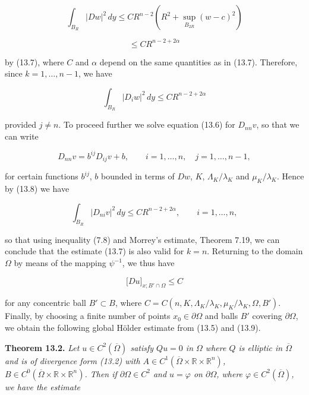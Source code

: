 \[
\int_{B_R} |Dw|^2\,dy \leq C R^{n-2}(R^2 + \sup_{B_{2R}}(w-c)^2)
\]

\[
\leq C R^{n-2+2\alpha}
\]

by (13.7), where $C$ and $\alpha$ depend on the same quantities as in (13.7). Therefore,
since $k=1,\dots,n-1$, we have

\begin{equation}
\int_{B_R} |D_i w|^2\,dy \leq C R^{n-2+2\alpha}
\tag{13.8}
\end{equation}

provided $j \neq n$. To proceed further we solve equation (13.6) for $D_{nn}v$, so that we
can write

\[
D_{nn}v = b^{ij}D_{ij}v + b,\qquad i=1,\dots,n,\quad j=1,\dots,n-1,
\]

for certain functions $b^{ij}$, $b$ bounded in terms of $Dw$, $K$, $\Lambda_K/\lambda_K$ and $\mu_K/\lambda_K$. Hence by
(13.8) we have

\[
\int_{B_R} |D_{ni}v|^2\,dy \leq C R^{n-2+2\alpha},\qquad i=1,\dots,n,
\]

so that using inequality (7.8) and Morrey's estimate, Theorem 7.19, we can
conclude that the estimate (13.7) is also valid for $k=n$. Returning to the domain $\Omega$
by means of the mapping $\psi^{-1}$, we thus have

\begin{equation}
\bigl[Du\bigr]_{x;B'\cap\Omega} \leq C
\tag{13.9}
\end{equation}



for any concentric ball $B' \subset B$, where $C = C(n, K, \Lambda_K/\lambda_K, \mu_K/\lambda_K, \Omega, B')$. Finally, by choosing a finite number of points $x_0 \in \partial\Omega$ and balls $B'$ covering $\partial\Omega$, we obtain the following global H\"older estimate from (13.5) and (13.9).

\begin{theorem}\label{thm:gt13-holder-gradient-13-2}
\textbf{Theorem 13.2.} \emph{Let $u \in C^2(\overline{\Omega})$ satisfy $Qu = 0$ in $\Omega$ where $Q$ is elliptic in $\overline{\Omega}$ and is of divergence form (13.2) with $A \in C^1(\overline{\Omega}\times \mathbb{R}\times \mathbb{R}^n)$, $B \in C^0(\overline{\Omega}\times \mathbb{R}\times \mathbb{R}^n)$. Then if $\partial\Omega \in C^2$ and $u=\varphi$ on $\partial\Omega$, where $\varphi \in C^2(\overline{\Omega})$, we have the estimate}
\end{theorem}

